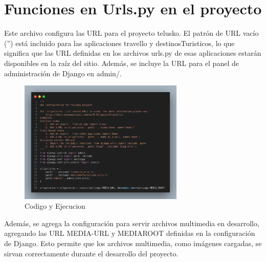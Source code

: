 \documentclass[10pt, a4paper]{article}
\begin{document}
\section{Funciones en Urls.py en el proyecto}
Este archivo configura las URL para el proyecto telusko. El patrón de URL vacío ('') está incluido para las aplicaciones travello y destinosTuristicos, lo que significa que las URL definidas en los archivos urls.py de esas aplicaciones estarán disponibles en la raíz del sitio. Además, se incluye la URL para el panel de administración de Django en admin/.


\begin{figure}[H]
  \centering
  \includegraphics[width=0.7\textwidth]{img/urls-telusko.png}
  \caption{Codigo y Ejecucion}
\end{figure}

\singlespacing
Además, se agrega la configuración para servir archivos multimedia en desarrollo, agregando las URL MEDIA-URL y MEDIAROOT definidas en la configuración de Django. Esto permite que los archivos multimedia, como imágenes cargadas, se sirvan correctamente durante el desarrollo del proyecto.
\end{document}
